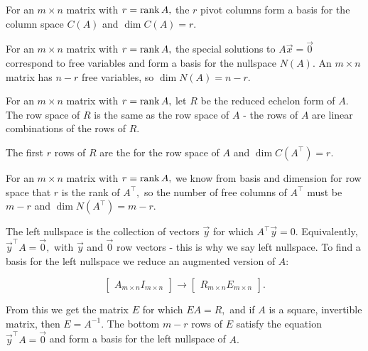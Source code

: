 \documentclass{article}
\begin{document}
\begin{theorem}
	For an $m \times n$ \@{matrix} with $r = \operatorname{rank}{A},$ the $r$ \@{pivot columns} form a \@{basis} for the \@{column space} $C(A)$ and $\dim{C(A)} = r.$
\end{theorem}

\begin{theorem}
	For an $m \times n$ \@{matrix} with $r = \operatorname{rank}{A},$ the \@{special solutions} to $A\vec{x} = \vec{0}$ correspond to \@{free variables} and form a \@{basis} for the \@{nullspace} $N(A).$ An $m \times n$ matrix has $n - r$ free variables, so $\dim{N(A)} = n - r.$
\end{theorem}

\begin{theorem}
	For an $m \times n$ \@{matrix} with $r = \operatorname{rank}{A},$ let $R$ be the \@{reduced echelon} form of $A.$ The \@{row space} of $R$ is the same as the row space of $A$ - the rows of $A$ are \@{linear combinations} of the rows of $R.$ 

	The first $r$ rows of $R$ are the  for the row space of $A$ and $\dim{C(A^\top)} = r.$
\end{theorem}

\begin{theorem}
	For an $m \times n$ \@{matrix} with $r = \operatorname{rank}{A},$ we know from \@{basis and dimension for row space} that $r$ is the \@{rank} of $A^\top,$ so the number of \@{free columns} of $A^\top$ must be $m - r$ and $\dim{N(A^\top)} = m - r.$

	The left nullspace is the collection of vectors $\vec{y}$ for which $A^\top \vec{y} = 0.$ Equivalently, $\vec{y}^\top A = \vec{0},$ with $\vec{y}$ and $\vec{0}$ row vectors - this is why we say \@{left nullspace}. To find a basis for the left nullspace we reduce an \@{augmented} version of $A$:

	\[ \begin{bmatrix} A_{m \times n} I_{m \times n} \end{bmatrix} \to \begin{bmatrix} R_{m \times n} E_{m \times n} \end{bmatrix}. \]

	From this we get the matrix $E$ for which $EA = R,$ and if $A$ is a \@{square}, \@{invertible} matrix, then $E = A^{-1}.$ The bottom $m - r$ rows of $E$ satisfy the equation $\vec{y}^\top A = \vec{0}$ and form a basis for the left nullspace of $A.$
\end{theorem}
\end{document}
